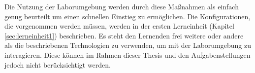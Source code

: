 Die Nutzung der Laborumgebung werden durch diese Maßnahmen als einfach genug beurteilt um einen schnellen Einstieg zu ermöglichen.
Die Konfigurationen, die vorgenommen werden müssen, werden in der ersten Lerneinheit (Kapitel \ref{sec:lerneinheit1}) beschrieben.
Es steht den Lernenden frei weitere oder andere als die beschriebenen Technologien zu verwenden, um mit der Laborumgebung zu interagieren.
Diese können im Rahmen dieser Thesis und den Aufgabenstellungen jedoch nicht berücksichtigt werden.

\pagebreak